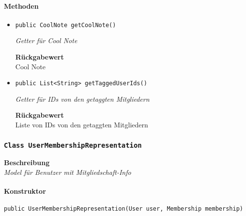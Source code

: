     \paragraph*{Methoden}
    \begin{itemize}
    	\item{\texttt{public CoolNote getCoolNote()}}
    	
    	\textit{Getter für Cool Note}
    	
    	
    	
    	\textbf{Rückgabewert} \\
    	Cool Note        \item{\texttt{public List<String> getTaggedUserIds()}}
    	
    	\textit{Getter für IDs von den getaggten Mitgliedern}
    	
    	
    	
    	\textbf{Rückgabewert} \\
    	Liste von IDs von den getaggten Mitgliedern
    \end{itemize}
    \subsubsection{\texttt{Class UserMembershipRepresentation}}
    \textbf{Beschreibung} \\
    \textit{Model für Benutzer mit Mitgliedschaft-Info}
    \paragraph*{Konstruktor}
    \texttt{public UserMembershipRepresentation(User user, Membership membership)}
